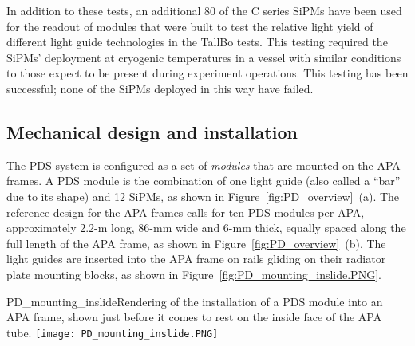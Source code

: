

In addition to these tests, an additional 80 of the C series SiPMs have been used for the
readout of modules that were built to test the relative light yield of
different light guide technologies in the TallBo tests.  %
This testing 
required the SiPMs' deployment at cryogenic temperatures in a vessel with 
similar conditions to those expect to be present during experiment operations. 
This testing has been successful; none of the SiPMs deployed in this way have failed.

\subsection{Mechanical design and installation}



The PDS system is configured as a set of \textit{modules} that are mounted on the APA frames.  A PDS module is
the combination of one light guide (also called a ``bar'' due to its
shape) and 12 SiPMs, as shown in Figure~\ref{fig:PD_overview}~(a).  %
The reference design for the APA frames calls for ten PDS modules per APA, approximately 2.2-m long,
86-mm wide and 6-mm thick, equally spaced along the full length of the
APA frame, as shown in Figure~\ref{fig:PD_overview}~(b). 
The light guides are inserted into the APA frame on rails gliding on their radiator
plate mounting blocks, as shown in Figure~\ref{fig:PD_mounting_inslide.PNG}.

\begin{cdrfigure}
  {PD_mounting_inslide}{Rendering of the installation of a PDS module
    into an APA frame, shown just before it comes to rest on the inside face
    of the APA tube.}
\texttt{[image: PD\_mounting\_inslide.PNG]}
\end{cdrfigure}

